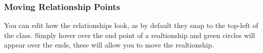 \documentclass[a4paper]{article}
\begin{document}
\subsubsection{Moving Relationship Points}
You can edit how the relationships look, as by default they snap to the top-left of the class. Simply hover over the end point of a realtionship and green circles will appear over the ends, these will allow you to move the realtionship.
\vspace{-5pt}
\begin{figure}[H]
\begin{center}
 \imagespace
{}

\end{center}
\end{figure}
\end{document}
